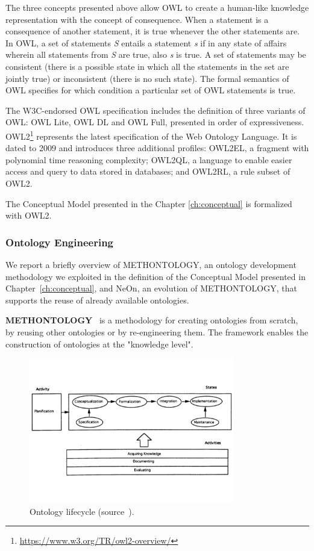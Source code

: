 The three concepts presented above allow OWL to create a human-like knowledge representation with the concept of consequence. When a statement is a consequence of another statement, it is true whenever the other statements are. In OWL, a set of statements \textit{S} entails a statement \textit{s} if in any state of affairs wherein all statements from \textit{S} are true, also \textit{s} is true. A set of statements may be consistent (there is a possible state in which all the statements in the set are jointly true) or inconsistent (there is no such state). The formal semantics of OWL specifies for which condition a particular set of OWL statements is true.

The W3C-endorsed OWL specification includes the definition of three variants of OWL: OWL Lite, OWL DL and OWL Full, presented in order of expressiveness.
OWL2\footnote{\url{https://www.w3.org/TR/owl2-overview/}} represents the latest specification of the  Web Ontology Language. It is dated to 2009 and introduces three additional profiles: OWL2EL, a fragment with polynomial time reasoning complexity; OWL2QL, a language to enable easier access and query to data stored in databases; and OWL2RL, a rule subset of OWL2.

The Conceptual Model presented in the Chapter \ref{ch:conceptual} is formalized with OWL2.

\subsubsection{Ontology Engineering}\label{sec:onto-eng}
We report a briefly overview of METHONTOLOGY, an ontology development methodology we exploited in the definition of the Conceptual Model presented in Chapter~\ref{ch:conceptual}, and NeOn, an evolution of METHONTOLOGY, that supports the reuse of already available ontologies.

\textbf{METHONTOLOGY}~\cite{fernandez1997methontology} is a methodology for creating ontologies from scratch, by reusing other ontologies or by re-engineering them. The framework enables the construction of ontologies at the "knowledge level". 

\begin{figure}[t]
  \begin{center}
    \includegraphics[width=0.8\textwidth]{img/methontology}
    \caption{Ontology lifecycle (source~\cite{fernandez1997methontology}).}
    \label{fig:methontology}
  \end{center}
\end{figure}

